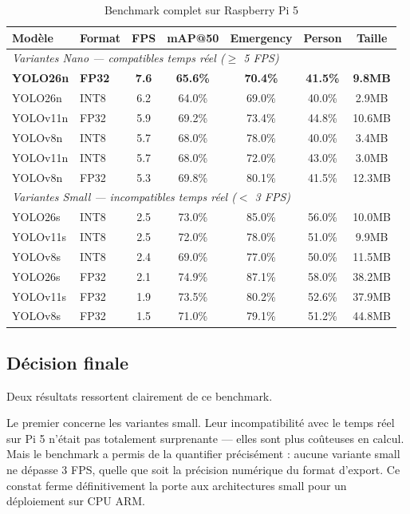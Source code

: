 \begin{table}[H]
\centering
\caption{Benchmark complet sur Raspberry Pi 5}
\small
\begin{tabularx}{\textwidth}{llccccc}
\toprule
\textbf{Modèle} &
\textbf{Format} &
\textbf{FPS} &
\textbf{mAP@50} &
\textbf{Emergency} &
\textbf{Person} &
\textbf{Taille} \\
\midrule
\multicolumn{7}{l}{\textit{Variantes Nano —
compatibles temps réel ($\geq$ 5 FPS)}} \\
\midrule
\rowcolor{PrimaryBlue!10}
\textbf{YOLO26n} & \textbf{FP32} &
\textbf{7.6} & \textbf{65.6\%} &
\textbf{70.4\%} & \textbf{41.5\%} &
\textbf{9.8MB} \\
YOLO26n  & INT8 & 6.2 & 64.0\% &
69.0\% & 40.0\% & 2.9MB \\
YOLOv11n & FP32 & 5.9 & 69.2\% &
73.4\% & 44.8\% & 10.6MB \\
YOLOv8n  & INT8 & 5.7 & 68.0\% &
78.0\% & 40.0\% & 3.4MB \\
YOLOv11n & INT8 & 5.7 & 68.0\% &
72.0\% & 43.0\% & 3.0MB \\
YOLOv8n  & FP32 & 5.3 & 69.8\% &
80.1\% & 41.5\% & 12.3MB \\
\midrule
\multicolumn{7}{l}{\textit{Variantes Small —
incompatibles temps réel ($<$ 3 FPS)}} \\
\midrule
YOLO26s  & INT8 & 2.5 & 73.0\% &
85.0\% & 56.0\% & 10.0MB \\
YOLOv11s & INT8 & 2.5 & 72.0\% &
78.0\% & 51.0\% & 9.9MB \\
YOLOv8s  & INT8 & 2.4 & 69.0\% &
77.0\% & 50.0\% & 11.5MB \\
YOLO26s  & FP32 & 2.1 & 74.9\% &
87.1\% & 58.0\% & 38.2MB \\
YOLOv11s & FP32 & 1.9 & 73.5\% &
80.2\% & 52.6\% & 37.9MB \\
YOLOv8s  & FP32 & 1.5 & 71.0\% &
79.1\% & 51.2\% & 44.8MB \\
\bottomrule
\end{tabularx}
\label{tab:full_benchmark}
\end{table}

\subsection{Décision finale}

Deux résultats ressortent clairement
de ce benchmark.

Le premier concerne les variantes small.
Leur incompatibilité avec le temps réel
sur Pi 5 n'était pas totalement
surprenante — elles sont plus coûteuses
en calcul. Mais le benchmark a permis
de la quantifier précisément : aucune
variante small ne dépasse 3 FPS, quelle
que soit la précision numérique du format
d'export. Ce constat ferme définitivement
la porte aux architectures small pour
un déploiement sur CPU ARM.

